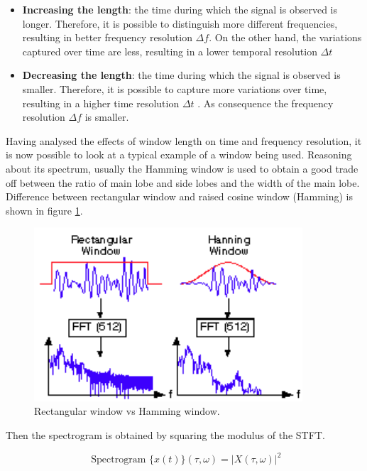 \begin{itemize}
     \item \textbf{Increasing the length}: the time during which the signal is observed is longer. Therefore, it is possible to distinguish more different frequencies, resulting in better frequency resolution $ \Delta f$. On the other hand, the variations captured over time are less, resulting in a lower temporal resolution $\Delta t$ 

         
    \item \textbf{Decreasing the length}: the time during which the signal is observed is smaller. Therefore, it is possible to capture more variations over time, resulting in a higher time resolution $ \Delta t$ . As consequence the frequency resolution $\Delta f$ is smaller.
    
\end{itemize}


Having analysed the effects of window length on time and frequency resolution, it is now possible to look at a typical example of a window being used.
Reasoning about its spectrum, usually the Hamming window is used to obtain a good trade off between the ratio of main lobe and side lobes and the width of the main lobe. Difference between rectangular window and raised cosine window (Hamming) is shown in figure \ref{rect_vs_hamming}.

\begin{figure}[h!]
    \centering
    \includegraphics[width=10cm]{Time-frequency analysis-chap3/img/Difference among window.png}
    \caption{Rectangular window vs Hamming window.}
    \label{rect_vs_hamming}
\end{figure}



Then the spectrogram is obtained by squaring the modulus of the STFT.

\begin{equation}
\text { Spectrogram }\{x(t)\}(\tau, \omega)=|X(\tau, \omega)|^{2}
\end{equation}

